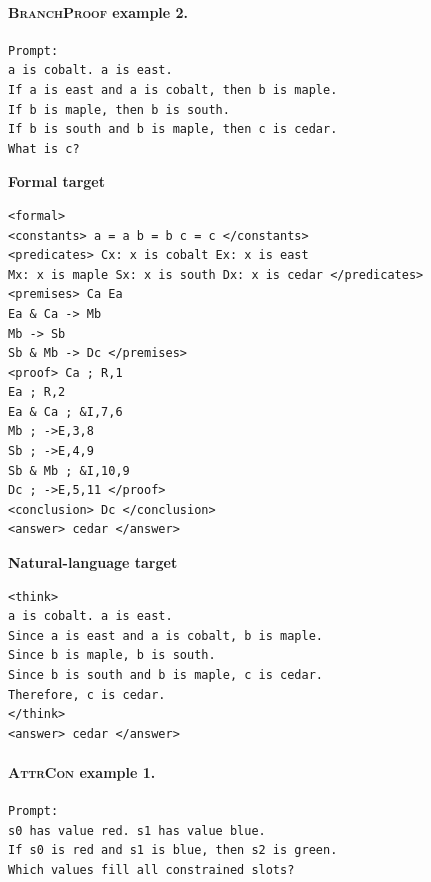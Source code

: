 \documentclass[11pt]{article}
\newcommand{\branchproof}{\textsc{BranchProof}}
\newcommand{\attrcon}{\textsc{AttrCon}}
\begin{document}
\paragraph{\branchproof{} example 2.}

\begin{verbatim}
Prompt:
a is cobalt. a is east.
If a is east and a is cobalt, then b is maple.
If b is maple, then b is south.
If b is south and b is maple, then c is cedar.
What is c?
\end{verbatim}

\noindent\begin{minipage}[t]{0.48\linewidth}
\textbf{Formal target}
\scriptsize
\begin{verbatim}
<formal>
<constants> a = a b = b c = c </constants>
<predicates> Cx: x is cobalt Ex: x is east
Mx: x is maple Sx: x is south Dx: x is cedar </predicates>
<premises> Ca Ea
Ea & Ca -> Mb
Mb -> Sb
Sb & Mb -> Dc </premises>
<proof> Ca ; R,1
Ea ; R,2
Ea & Ca ; &I,7,6
Mb ; ->E,3,8
Sb ; ->E,4,9
Sb & Mb ; &I,10,9
Dc ; ->E,5,11 </proof>
<conclusion> Dc </conclusion>
<answer> cedar </answer>
\end{verbatim}
\end{minipage}\hfill
\begin{minipage}[t]{0.48\linewidth}
\textbf{Natural-language target}
\scriptsize
\begin{verbatim}
<think>
a is cobalt. a is east.
Since a is east and a is cobalt, b is maple.
Since b is maple, b is south.
Since b is south and b is maple, c is cedar.
Therefore, c is cedar.
</think>
<answer> cedar </answer>
\end{verbatim}
\end{minipage}

\paragraph{\attrcon{} example 1.}

\begin{verbatim}
Prompt:
s0 has value red. s1 has value blue.
If s0 is red and s1 is blue, then s2 is green.
Which values fill all constrained slots?
\end{verbatim}
\end{document}
